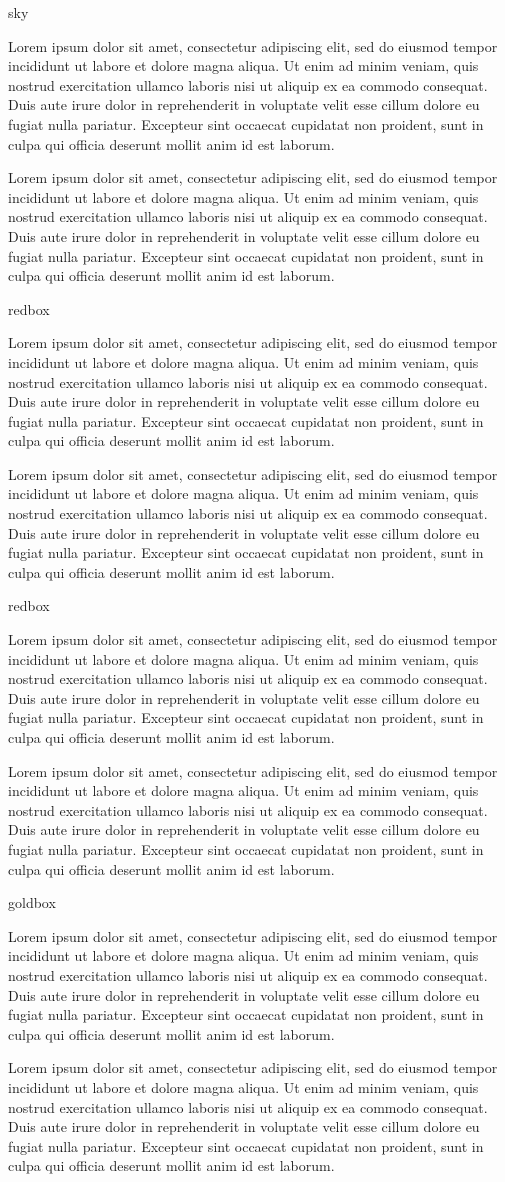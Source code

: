 \documentclass[10pt]{article}
\newcommand{\LoremIpsum}{
Lorem ipsum dolor sit amet, consectetur adipiscing elit, sed do eiusmod
tempor incididunt ut labore et dolore magna aliqua. Ut enim ad minim
veniam, quis nostrud exercitation ullamco laboris nisi ut aliquip ex ea
commodo consequat. Duis aute irure dolor in reprehenderit in voluptate
velit esse cillum dolore eu fugiat nulla pariatur. Excepteur sint
occaecat cupidatat non proident, sunt in culpa qui officia deserunt
mollit anim id est laborum.
}
\begin{document}
    \renewcommand{\arraystretch}{1.6}
    \begin{skillbox}{sky}
        \begin{minipage}[t]{0.48\linewidth}
            \LoremIpsum
        \end{minipage}
        \hfill
        \begin{minipage}[t]{0.48\linewidth}
            \LoremIpsum
        \end{minipage}
    \end{skillbox}

    \renewcommand{\arraystretch}{1.6}
    \begin{skillbox}{redbox}
        \begin{minipage}[t]{0.48\linewidth}
            \LoremIpsum
        \end{minipage}
        \hfill
        \begin{minipage}[t]{0.48\linewidth}
            \LoremIpsum
        \end{minipage}
    \end{skillbox}

    \renewcommand{\arraystretch}{1.6}
    \begin{skillbox}{redbox}
        \begin{minipage}[t]{0.48\linewidth}
            \LoremIpsum
        \end{minipage}
        \hfill
        \begin{minipage}[t]{0.48\linewidth}
            \LoremIpsum
        \end{minipage}
    \end{skillbox}

    \renewcommand{\arraystretch}{1.6}
    \begin{skillbox}{goldbox}
        \begin{minipage}[t]{0.48\linewidth}
            \LoremIpsum
        \end{minipage}
        \hfill
        \begin{minipage}[t]{0.48\linewidth}
            \LoremIpsum
        \end{minipage}
    \end{skillbox}
\end{document}
